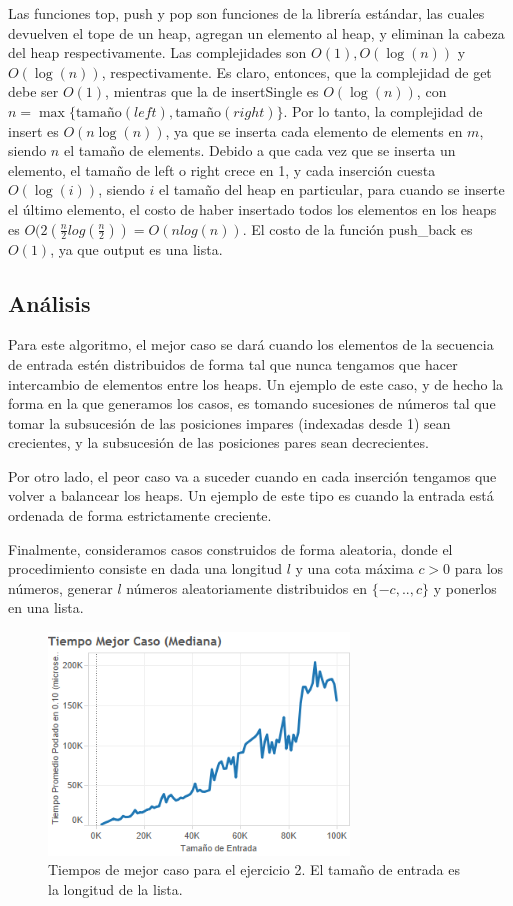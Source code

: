\documentclass{article}
\theoremstyle{definition}
\theoremstyle{remark}
\begin{document}
Las funciones top, push y pop son funciones de la librería estándar, las cuales devuelven el tope de un heap, agregan un elemento al heap, y eliminan la cabeza del heap respectivamente. Las complejidades son $O(1), O(\log(n))$ y $O(\log(n))$, respectivamente. Es claro, entonces, que la complejidad de get debe ser $O(1)$, mientras que la de insertSingle es $O(\log(n))$, con $n = \max\{\text{tamaño}(left), \text{tamaño}(right)\}$. Por lo tanto, la complejidad de insert es $O(n \log(n))$, ya que se inserta cada elemento de elements en $m$, siendo $n$ el tamaño de elements. Debido a que cada vez que se inserta un elemento, el tamaño de left o right crece en 1, y cada inserción cuesta $O(\log(i))$, siendo $i$ el tamaño del heap en particular, para cuando se inserte el último elemento, el costo de haber insertado todos los elementos en los heaps es $O(2(\frac{n}{2} log(\frac{n}{2})) = O(nlog(n))$. El costo de la función push\_back es $O(1)$, ya que output es una lista.

\subsection{Análisis}

Para este algoritmo, el mejor caso se dará cuando los elementos de la secuencia de entrada estén distribuidos de forma tal que nunca tengamos que hacer intercambio de elementos entre los heaps. Un ejemplo de este caso, y de hecho la forma en la que generamos los casos, es tomando sucesiones de números tal que tomar la subsucesión de las posiciones impares (indexadas desde 1) sean crecientes, y la subsucesión de las posiciones pares sean decrecientes.

Por otro lado, el peor caso va a suceder cuando en cada inserción tengamos que volver a balancear los heaps. Un ejemplo de este tipo es cuando la entrada está ordenada de forma estrictamente creciente.

Finalmente, consideramos casos construidos de forma aleatoria, donde el procedimiento consiste en dada una longitud $l$ y una cota máxima $c > 0$ para los números, generar $l$ números aleatoriamente distribuidos en $\{-c, .., c\}$ y ponerlos en una lista.

\begin{figure}[h!]
\centering
\label{grf:ex2-best}
\includegraphics[width=8cm]{images/ex2-best}
\caption{Tiempos de mejor caso para el ejercicio 2. El tamaño de entrada es la longitud de la lista.}
\end{figure}
\end{document}
